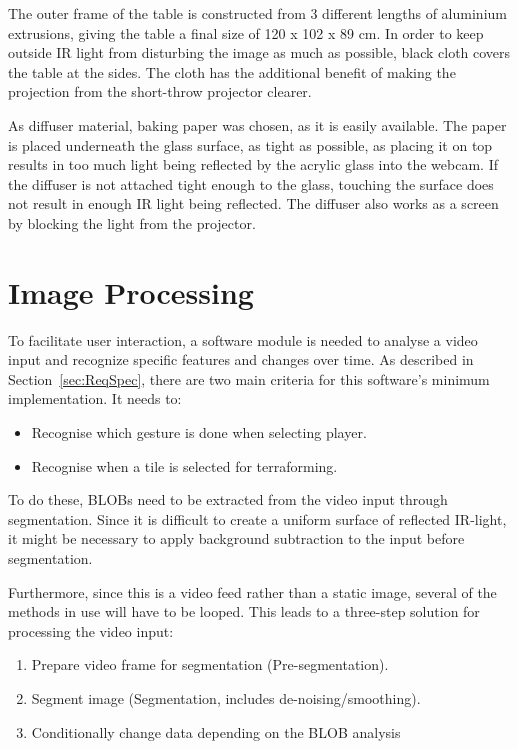 The outer frame of the table is constructed from 3 different lengths of aluminium extrusions, giving the table a final size of 120 x 102 x 89 cm.
In order to keep outside IR light from disturbing the image as much as possible, black cloth covers the table at the sides. The cloth has the additional benefit of making the projection from the short-throw projector clearer. 

As diffuser material, baking paper was chosen, as it is easily available. The paper is placed underneath the glass surface, as tight as possible, as placing it on top results in too much light being reflected by the acrylic glass into the webcam. If the diffuser is not attached tight enough to the glass, touching the surface does not result in enough IR light being reflected. The diffuser also works as a screen by blocking the light from the projector. 

\section{Image Processing}
To facilitate user interaction, a software module is needed to analyse a video input and recognize specific features and changes over time. As described in Section~\ref{sec:ReqSpec}, there are two main criteria for this software's minimum implementation. It needs to:
\begin{itemize}
\item Recognise which gesture is done when selecting player.
\item Recognise when a tile is selected for terraforming.
\end{itemize}

To do these, BLOBs need to be extracted from the video input through segmentation. Since it is difficult to create a uniform surface of reflected IR-light, it might be necessary to apply background subtraction to the input before segmentation. 

Furthermore, since this is a video feed rather than a static image, several of the methods in use will have to be looped. This leads to a three-step solution for processing the video input:

\begin{enumerate}
\item Prepare video frame for segmentation (Pre-segmentation).
\item Segment image (Segmentation, includes de-noising/smoothing).
\item Conditionally change data depending on the BLOB analysis
\end{enumerate}

